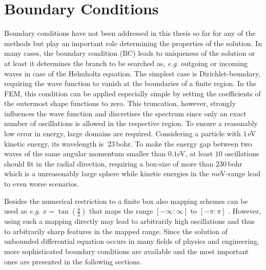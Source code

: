 \section{Boundary Conditions}
\label{ch:BC}
Boundary conditions have not been addressed in this thesis so far for any of the methods but play an important role determining the properties of the solution.
In many cases, the boundary condition (BC) leads to uniqueness of the solution or at least it determines the branch to be searched as, \textit{e.g.} outgoing or incoming waves in case of the Helmholtz equation.
The simplest case is Dirichlet-boundary, requiring the wave function to vanish at the boundaries of a finite region.
In the FEM, this condition can be applied especially simple by setting the coefficients of the outermost shape functions to zero.
This truncation, however, strongly influences the wave function and discretises the spectrum since only an exact number of oscillations is allowed in the respective region.
To ensure a reasonably low error in energy, large domains are required.
Considering a particle with $1\,$eV kinetic energy, its wavelength is $~23\,$bohr.
To make the energy gap between two waves of the same angular momentum smaller than $0.1$eV, at least $10$ oscillations should fit in the radial direction, requiring a box-size of more than $230\,$bohr which is a unreasonably large sphere while kinetic energies in the $m$eV-range lead to even worse scenarios.
%

Besides the numerical restriction to a finite box also mapping schemes can be used as \textit{e.g.} $x=\tan (\frac y2)$ that maps the range $[-\infty:\infty]$ to $[-\pi:\pi]$ \cite{PSbook}.
However, using such a mapping directly may lead to arbitrarily high oscillations and thus to arbitrarily sharp features in the mapped range. %
Since the solution of unbounded differential equation occurs in many fields of physics and engineering, more sophisticated boundary conditions are available and the most important ones are presented in the following sections.

